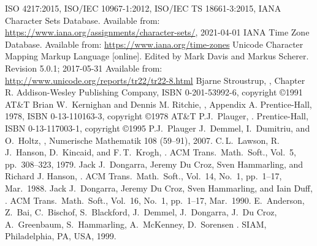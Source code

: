 
\begin{thebibliography}{99}
  ISO 4217:2015,
  ISO/IEC 10967-1:2012,
  ISO/IEC TS 18661-3:2015,
  IANA Character Sets Database.
  Available from:\newline
  \url{https://www.iana.org/assignments/character-sets/}, 2021-04-01
  IANA Time Zone Database.
  Available from: \url{https://www.iana.org/time-zones}
  Unicode Character Mapping Markup Language [online].
  Edited by Mark Davis and Markus Scherer. Revision 5.0.1; 2017-05-31
  Available from: \url{http://www.unicode.org/reports/tr22/tr22-8.html}
  Bjarne Stroustrup,
  , Chapter R\@.
  Addison-Wesley Publishing Company, ISBN 0-201-53992-6, copyright \copyright 1991 AT\&T
  Brian W.\ Kernighan and Dennis M. Ritchie,
  , Appendix A\@.
  Prentice-Hall, 1978, ISBN 0-13-110163-3, copyright \copyright 1978 AT\&T
  P.J.\ Plauger,
  .
  Prentice-Hall, ISBN 0-13-117003-1, copyright \copyright 1995 P.J.\ Plauger
  J.\ Demmel, I.\ Dumitriu, and O.\ Holtz,
  ,
  Numerische Mathematik 108 (59--91), 2007.
  C.\,L.\ Lawson, R.\,J.\ Hanson, D.\ Kincaid, and F.\,T.\ Krogh,
  .
  ACM Trans.\ Math.\ Soft., Vol.\ 5, pp.\ 308--323, 1979.
  Jack J.\ Dongarra, Jeremy Du Croz, Sven Hammarling, and Richard J. Hanson,
  .
  ACM Trans.\ Math.\ Soft., Vol.\ 14, No.\ 1, pp.\ 1--17, Mar.\ 1988.
  Jack J.\ Dongarra, Jeremy Du Croz, Sven Hammarling, and Iain Duff,
  .
  ACM Trans.\ Math.\ Soft., Vol.\ 16, No.\ 1, pp.\ 1--17, Mar.\ 1990.
  E.\ Anderson, Z.\ Bai, C.\ Bischof, S.\ Blackford, J.\ Demmel, J.\ Dongarra,
  J.\ Du Croz, A.\ Greenbaum, S.\ Hammarling, A.\ McKenney, D.\ Sorensen
  .
  SIAM, Philadelphia, PA, USA, 1999.
\end{thebibliography}

